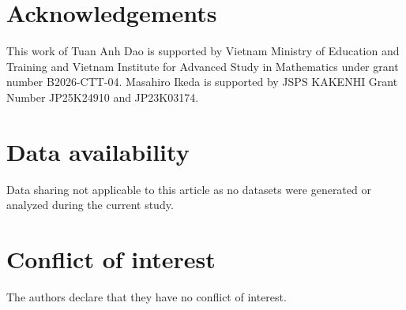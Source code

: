 \documentclass[a4paper,11pt]{article} %
\theoremstyle{remark}
\theoremstyle{definition}
\numberwithin{equation}{section}
\begin{document}
\section*{Acknowledgements}
This work of Tuan Anh Dao is supported by Vietnam Ministry of Education and Training and Vietnam Institute for Advanced Study in Mathematics under grant number B2026-CTT-04. Masahiro Ikeda is supported by JSPS KAKENHI Grant Number JP25K24910 and JP23K03174. 


\section*{Data availability}
Data sharing not applicable to this article as no datasets were generated or analyzed during the current study.


\section*{Conflict of interest}
The authors declare that they have no conflict of interest.
\end{document}
